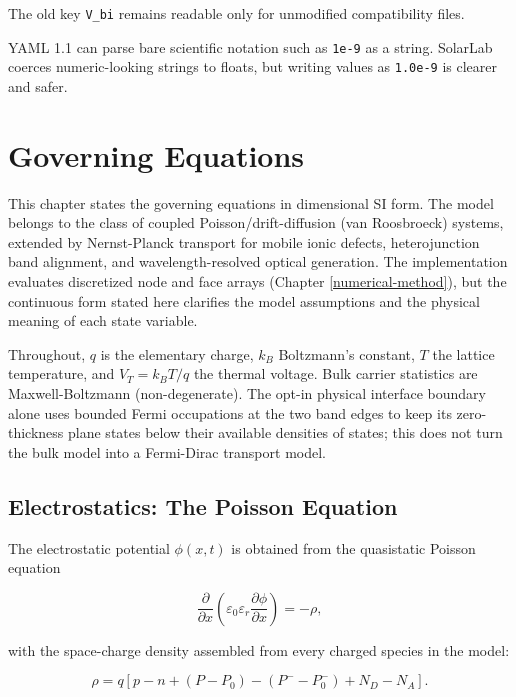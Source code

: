 \documentclass[
  11pt,
  american,
]{report}
\begin{document}
The old key \texttt{V\_bi} remains readable only for unmodified
compatibility files.

YAML 1.1 can parse bare scientific notation such as \texttt{1e-9} as a
string. SolarLab coerces numeric-looking strings to floats, but writing
values as \texttt{1.0e-9} is clearer and safer.

\hypertarget{governing-equations}{%
\chapter{Governing Equations}\label{governing-equations}}

This chapter states the governing equations in dimensional SI form. The
model belongs to the class of coupled Poisson/drift-diffusion (van
Roosbroeck) systems, extended by Nernst-Planck transport for mobile
ionic defects, heterojunction band alignment, and wavelength-resolved
optical generation. The implementation evaluates discretized node and
face arrays (Chapter \ref{numerical-method}), but the continuous form
stated here clarifies the model assumptions and the physical meaning of
each state variable.

Throughout, \(q\) is the elementary charge, \(k_B\) Boltzmann's
constant, \(T\) the lattice temperature, and \(V_T = k_B T/q\) the
thermal voltage. Bulk carrier statistics are Maxwell-Boltzmann
(non-degenerate). The opt-in physical interface boundary alone uses
bounded Fermi occupations at the two band edges to keep its
zero-thickness plane states below their available densities of states;
this does not turn the bulk model into a Fermi-Dirac transport model.

\hypertarget{electrostatics-the-poisson-equation}{%
\section{Electrostatics: The Poisson
Equation}\label{electrostatics-the-poisson-equation}}

The electrostatic potential \(\phi(x,t)\) is obtained from the
quasistatic Poisson equation

\begin{equation}
\label{eq:poisson}
\frac{\partial}{\partial x}
\left(
\varepsilon_0 \varepsilon_r
\frac{\partial \phi}{\partial x}
\right)
= -\rho ,
\end{equation}

with the space-charge density assembled from every charged species in
the model:

\begin{equation}
\label{eq:charge-density}
\rho
=
q\left[
p - n + \left(P - P_0\right) - \left(P^- - P^-_0\right)
+ N_D - N_A
\right].
\end{equation}
\end{document}
